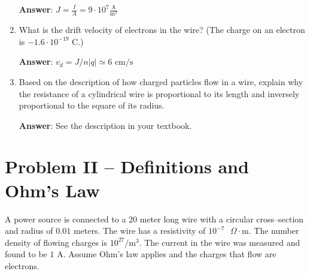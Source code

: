 \documentclass{article}
\newcommand{\ds}[0]{\displaystyle}
\begin{document}
\begin{enumerate}
        \ifsolutions
        \textbf{Answer}: $\ds J=\frac{I}{A} = 9\cdot 10^7 \frac{\text{A}}{\text{m}^2}$
        \else
        \vskip 84pt
        \fi

  \item What is the drift velocity of electrons in the wire? (The charge on an electron is $-1.6·10^{-19}\text{ C}$.)

        \ifsolutions
        \textbf{Answer}: $v_d = J/n|q| \simeq 6\text{ cm/s}$
        \else
        \vskip 84pt
        \fi

  \item Based on the description of how charged particles flow in a wire, explain why the resistance of a cylindrical wire is proportional to its length and inversely proportional to the square of its radius.

        \ifsolutions
        \textbf{Answer}: See the description in your textbook.
        \else

        \fi

\end{enumerate}

\ifsolutions

\else

\newpage
\fi

\section{Problem II -- Definitions and Ohm's Law}

A power source is connected to a $20$ meter long wire with a circular cross--section and radius of $0.01$ meters. The wire has a resistivity of $10^{-7}\text{ }\Omega\cdot\text{m}$. The number density of flowing charges is $10^{27}/\text{m}^3$. The current in the wire was measured and found to be $1\text{ A}$. Assume Ohm's law applies and the charges that flow are electrons.
\end{document}
